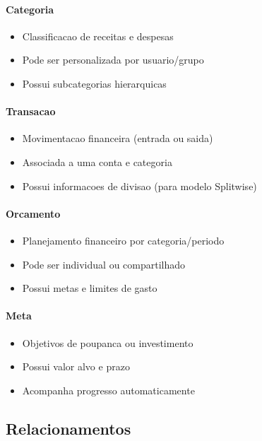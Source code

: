 \paragraph{Categoria}
\begin{itemize}
    \item Classificacao de receitas e despesas
    \item Pode ser personalizada por usuario/grupo
    \item Possui subcategorias hierarquicas
\end{itemize}

\paragraph{Transacao}
\begin{itemize}
    \item Movimentacao financeira (entrada ou saida)
    \item Associada a uma conta e categoria
    \item Possui informacoes de divisao (para modelo Splitwise)
\end{itemize}

\paragraph{Orcamento}
\begin{itemize}
    \item Planejamento financeiro por categoria/periodo
    \item Pode ser individual ou compartilhado
    \item Possui metas e limites de gasto
\end{itemize}

\paragraph{Meta}
\begin{itemize}
    \item Objetivos de poupanca ou investimento
    \item Possui valor alvo e prazo
    \item Acompanha progresso automaticamente
\end{itemize}

\subsection{Relacionamentos}

